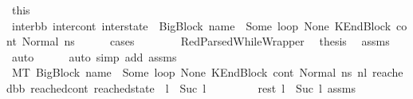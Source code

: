\begin{isabellebody}
\ this\ \isamarkupfalse%
\ {\isachardoublequoteopen}{\isacharparenleft}{\kern0pt}inter{\isacharunderscore}{\kern0pt}bb{\isacharcomma}{\kern0pt}\ inter{\isacharunderscore}{\kern0pt}cont{\isacharcomma}{\kern0pt}\ inter{\isacharunderscore}{\kern0pt}state{\isacharparenright}{\kern0pt}\ {\isacharequal}{\kern0pt}\ {\isacharparenleft}{\kern0pt}BigBlock\ name\ {\isacharbrackleft}{\kern0pt}{\isacharbrackright}{\kern0pt}\ {\isacharparenleft}{\kern0pt}Some\ loop{\isacharparenright}{\kern0pt}\ None{\isacharcomma}{\kern0pt}\ KEndBlock\ cont{}{\isacharcomma}{\kern0pt}\ Normal\ ns{\isacharparenright}{\kern0pt}{\isachardoublequoteclose}\isanewline
\ \ \ \ \isamarkupfalse%
\ cases\isanewline
\ \ \ \ \ \ \isamarkupfalse%
\ RedParsedWhileWrapper\ \isamarkupfalse%
\ {\isacharquery}{\kern0pt}thesis\ \isamarkupfalse%
\ assms{\isacharparenleft}{\kern0pt}{}{\isacharparenright}{\kern0pt}\ \isamarkupfalse%
\ auto\isanewline
\ \ \ \ \isamarkupfalse%
\ {\isacharparenleft}{\kern0pt}auto\ simp\ add{\isacharcolon}{\kern0pt}\ assms{\isacharparenleft}{\kern0pt}{}{\isacharparenright}{\kern0pt}{\isacharparenright}{\kern0pt}\isanewline
\ \ \ \ \isamarkupfalse%
\ {\isachardoublequoteopen}{\isacharparenleft}{\kern0pt}M{\isacharcomma}{\kern0pt}{\isasymLambda}{\isacharcomma}{\kern0pt}{\isasymGamma}{\isacharcomma}{\kern0pt}{\isasymOmega}{\isacharcomma}{\kern0pt}T\ {\isasymturnstile}{\isacharparenleft}{\kern0pt}BigBlock\ name\ {\isacharbrackleft}{\kern0pt}{\isacharbrackright}{\kern0pt}\ {\isacharparenleft}{\kern0pt}Some\ loop{\isacharparenright}{\kern0pt}\ None{\isacharcomma}{\kern0pt}\ KEndBlock\ cont{}{\isacharcomma}{\kern0pt}\ Normal\ ns{\isacharparenright}{\kern0pt}\ {\isacharminus}{\kern0pt}n{\isasymlongrightarrow}{\isacharcircum}{\kern0pt}l{}\ {\isacharparenleft}{\kern0pt}reached{\isacharunderscore}{\kern0pt}bb{\isacharcomma}{\kern0pt}\ reached{\isacharunderscore}{\kern0pt}cont{\isacharcomma}{\kern0pt}\ reached{\isacharunderscore}{\kern0pt}state{\isacharparenright}{\kern0pt}{\isacharparenright}{\kern0pt}\ {\isasymand}\ {\isacharparenleft}{\kern0pt}l\ {\isacharequal}{\kern0pt}\ Suc\ l{}{\isacharparenright}{\kern0pt}{\isachardoublequoteclose}\ \isanewline
\ \ \ \ \ \ \isamarkupfalse%
\ rest\ {\isacartoucheopen}l\ {\isacharequal}{\kern0pt}\ Suc\ l{}{\isacartoucheclose}\ assms{\isacharparenleft}{\kern0pt}{}{\isacharparenright}{\kern0pt}\ \isamarkupfalse%

\end{isabellebody}
